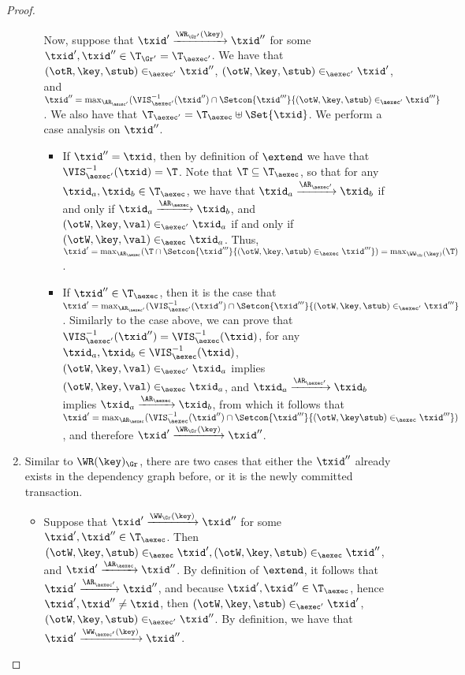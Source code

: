 \begin{proof}
\begin{enumerate}
\begin{itemize}
Now, suppose that $\txid' \xrightarrow{\WR_{\Gr'}(\key)} \txid''$ for some $\txid', \txid'' \in \T_{\Gr'} = 
\T_{\aexec'}$. We have that $ (\otR, \key, \stub) \in_{\aexec'} \txid''$, 
$(\otW, \key, \stub) \in_{\aexec'} \txid'$, and $\txid'' = \max_{\AR_{\aexec'}}(\VIS_{\aexec'}^{-1}(\txid'') 
\cap \Setcon{ \txid''' }{ (\otW, \key, \stub) \in_{\aexec'} \txid'''}$. 
We also have that $\T_{\aexec'} = \T_{\aexec} \uplus \Set{\txid}$. We perform a case 
analysis on $\txid''$. 

\begin{itemize}
\item If $\txid'' = \txid$, then by definition of $\extend$ we have that 
$\VIS^{-1}_{\aexec'}(\txid) = \T$. Note that $\T \subseteq \T_{\aexec}$, so that 
for any $\txid_{a}, \txid_{b} \in \T_{\aexec}$, we have that $\txid_{a} \xrightarrow{\AR_{\aexec'}} \txid_{b}$ 
if and only if $\txid_{a} \xrightarrow{\AR_{\aexec}} \txid_{b}$, 
and $(\otW, \key, \val) \in_{\aexec'} \txid_{a}$ if and only if $(\otW, \key, \val) \in_{\aexec} \txid_{a}$. 
Thus, $\txid' = \max_{\AR_{\aexec}}(\T 
\cap \Setcon{\txid''' }{ (\otW, \key, \stub) \in_{\aexec} \txid'''}) = \max_{\WW_{\Gr}(\key)}(\T)$. 

\item If $\txid'' \in \T_{\aexec}$, then it is the case that 
    $\txid' = \max_{\AR_{\aexec'}}(\VIS^{-1}_{\aexec'}(\txid'') \cap \Setcon{ \txid''' }{ (\otW, \key, \stub) \in_{\aexec'} \txid'''}$. 
Similarly to the case above, we can prove that $\VIS^{-1}_{\aexec'}(\txid'') = \VIS^{-1}_{\aexec}(\txid)$, 
for any $\txid_{a}, \txid_{b} \in \VIS^{-1}_{\aexec}(\txid)$, $(\otW, \key, \val) \in_{\aexec'} \txid_{a}$ 
implies $(\otW, \key, \val) \in_{\aexec} \txid_{a}$, and $\txid_{a} \xrightarrow{\AR_{\aexec'}} \txid_{b}$ 
implies $\txid_{a} \xrightarrow{\AR_{\aexec}} \txid_{b}$, from which it follows that 
$\txid' = \max_{\AR_{\aexec}}(\VIS^{-1}_{\aexec}(\txid'') \cap \Setcon{ \txid''' }{ (\otW, \key \stub) \in_{\aexec} \txid'''})$, 
and therefore $\txid' \xrightarrow{\WR_{\Gr}(\key)} \txid''$.
\end{itemize}
\end{itemize}

\item 
Similar to \( \WR(\key)_{\Gr} \), there are two cases that either the \( \txid'' \) already exists in the dependency graph before,
or it is the newly committed transaction.
\begin{itemize}
\item Suppose that $\txid' \xrightarrow{\WW_{\Gr}(\key)} \txid''$ for some $\txid', \txid'' \in \T_{\aexec}$. 
Then $(\otW,\key,\stub) \in_{\aexec} \txid', (\otW, \key, \stub) \in_{\aexec} \txid''$, and $\txid' \xrightarrow{\AR_{\aexec}} \txid''$. 
By definition of $\extend$, it follows that $\txid' \xrightarrow{\AR_{\aexec'}} \txid''$, and because 
$\txid', \txid'' \in \T_{\aexec}$, hence $\txid', \txid'' \neq \txid$, then 
$(\otW,\key, \stub) \in_{\aexec'} \txid'$, $(\otW, \key, \stub) \in_{\aexec'} \txid''$. By definition, 
we have that $\txid' \xrightarrow{\WW_{\aexec'}(\key)} \txid''$.


\end{itemize}
\end{enumerate}
\end{proof}
